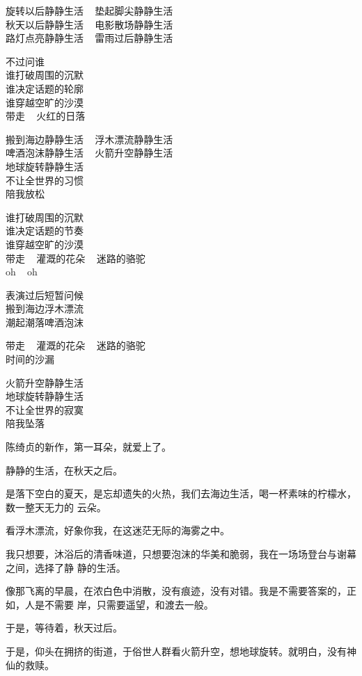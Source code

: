 \documentclass[12pt,a4paper]{article}
\begin{document}
		\longpoem{}{}{} \centering
		旋转以后静静生活 ~ 垫起脚尖静静生活 \\
		秋天以后静静生活 ~ 电影散场静静生活 \\
		路灯点亮静静生活 ~ 雷雨过后静静生活

		不过问谁 \\
		谁打破周围的沉默 \\
		谁决定话题的轮廓 \\
		谁穿越空旷的沙漠 \\
		带走 ~ 火红的日落

		搬到海边静静生活 ~ 浮木漂流静静生活 \\
		啤酒泡沫静静生活 ~ 火箭升空静静生活 \\
		地球旋转静静生活 \\
		不让全世界的习惯 \\
		陪我放松

		谁打破周围的沉默 \\
		谁决定话题的节奏 \\
		谁穿越空旷的沙漠 \\
		带走 ~ 灌溉的花朵 ~ 迷路的骆驼 \\
		oh ~ oh

		表演过后短暂问候 \\
		搬到海边浮木漂流 \\
		潮起潮落啤酒泡沫

		带走 ~ 灌溉的花朵 ~ 迷路的骆驼 \\
		时间的沙漏

		火箭升空静静生活 \\
		地球旋转静静生活 \\
		不让全世界的寂寞 \\
		陪我坠落
		\endlongpoem

		陈绮贞的新作，第一耳朵，就爱上了。

		静静的生活，在秋天之后。

		是落下空白的夏天，是忘却遗失的火热，我们去海边生活，喝一杯素味的柠檬水，数一整天无力的
	云朵。

		看浮木漂流，好象你我，在这迷茫无际的海雾之中。


		我只想要，沐浴后的清香味道，只想要泡沫的华美和脆弱，我在一场场登台与谢幕之间，选择了静
	静的生活。

		像那飞离的早晨，在浓白色中消散，没有痕迹，没有对错。我是不需要答案的，正如，人是不需要
	岸，只需要遥望，和渡去一般。


		于是，等待着，秋天过后。

		于是，仰头在拥挤的街道，于俗世人群看火箭升空，想地球旋转。就明白，没有神仙的救赎。
\end{document}
